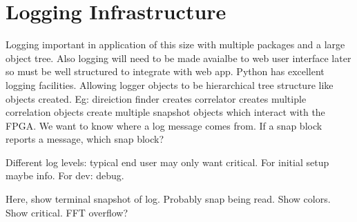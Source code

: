 \section{Logging Infrastructure}
Logging important in application of this size with multiple packages and a large object tree.
Also logging will need to be made avaialbe to web user interface later so must be well structured to integrate with web app.
Python has excellent logging facilities. Allowing logger objects to be hierarchical tree structure like objects created.
Eg: direiction finder creates correlator creates multiple correlation objects create multiple snapshot objects which interact with the FPGA. 
We want to know where a log message comes from. If a snap block reports a message, which snap block?

Different log levels: typical end user may only want critical. For initial setup maybe info. For dev: debug. 

Here, show terminal snapshot of log. Probably snap being read. Show colors. Show critical. FFT overflow?
